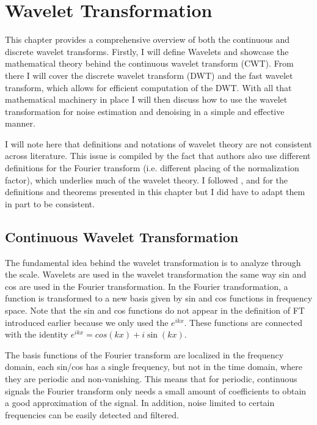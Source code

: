 \chapter{Wavelet Transformation} 


This chapter provides a comprehensive overview of both the continuous and discrete wavelet transforms. Firstly, I will define Wavelets and 
showcase the mathematical theory behind the continuous wavelet transform (CWT). From there I will cover the discrete wavelet transform (DWT) 
and the fast wavelet transform, which allows for efficient computation of the DWT. With all that mathematical machinery in place I will then 
discuss how to use the wavelet transformation for noise estimation and denoising in a simple and effective manner.

I will note here that definitions and notations of wavelet theory are not consistent across literature. 
This issue is compiled by the fact that authors also use different definitions for the Fourier transform 
(i.e. different placing of the normalization factor), which underlies much of the wavelet theory. I followed \cite{sauer-notes},
\cite{mallat2008wavelet} and \cite{shah2022wavelet} for the definitions and theorems presented in this chapter but I did have to adapt them in part to be consistent. 

\section{Continuous Wavelet Transformation}
The fundamental idea behind the wavelet transformation is to analyze through the scale. Wavelets are used in the wavelet transformation the same way sin and cos are used
in the Fourier transformation. In the Fourier transformation, a function is transformed to a new basis given by sin and cos functions in frequency space.
Note that the sin and cos functions do not appear in the definition of FT introduced earlier because we only used the $e^{ikx}$. These functions 
are connected with the identity $e^{ikx} = cos(kx) + i \sin(kx)$.

The basis functions of the Fourier transform are localized in the frequency domain, each sin/cos has a single frequency, but not in the time domain,
where they are periodic and non-vanishing. This means that for periodic,
continuous signals the Fourier transform only needs a small amount of coefficients to obtain a good approximation of the signal.
In addition, noise limited to certain frequencies can be easily detected and filtered. 


